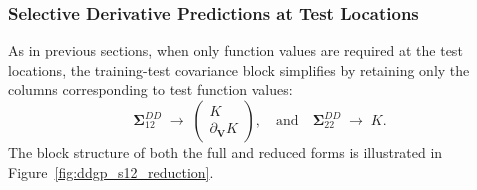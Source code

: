 \documentclass[12pt]{article}
\begin{document}
\subsubsection{Selective Derivative Predictions at Test Locations}
\label{subsubsec:ddgp_selective_pred}
As in previous sections, when only function values are required at the test locations, the training-test covariance block simplifies by retaining only the columns corresponding to test function values:
\begin{equation}
	\boldsymbol{\Sigma}_{12}^{DD} \;\longrightarrow\;
	\begin{pmatrix}
		K \\
		\partial_{\mathbf{V}} K
	\end{pmatrix}, \quad \text{and} \quad
	\boldsymbol{\Sigma}_{22}^{DD} \;\longrightarrow\; K.
\end{equation}
The block structure of both the full and reduced forms is illustrated in Figure~\ref{fig:ddgp_s12_reduction}.
\end{document}
